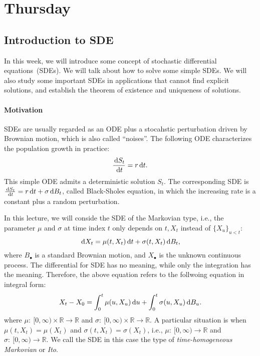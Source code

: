 


\section{Thursday}

\subsection{Introduction to SDE}
In this week, we will introduce some concept of stochastic differential equations~(SDEs).
We will talk about how to solve some simple SDEs.
We will also study some important SDEs in applications that cannot find explicit solutions, and establish the theorem of existence and uniqueness of solutions.

\paragraph{Motivation}
SDEs are usually regarded as an ODE plus a stocahstic perturbation driven by Brownian motion, which is also called ``noises''.
The following ODE characterizes the population growth in practice:
\[
\frac{\,\mathrm{d} S_t}{\,\mathrm{d} t}=r\,\mathrm{d} t.
\]
This simple ODE admits a deterministic solution $S_t$. 
The corresponding SDE is $\frac{\,\mathrm{d} S_t}{\,\mathrm{d} t} = r\,\mathrm{d} t + \sigma\,\mathrm{d} B_t$, called Black-Sholes equation, in which the increasing rate is a constant plus a random perturbation.

In this lecture, we will conside the SDE of the Markovian type, i.e., the parameter $\mu$ and $\sigma$ at time index $t$ only depends on $t,X_t$ instead of $\{X_u\}_{u<t}$:
\begin{equation}\label{Eq:13:1}
\diff X_t = \mu(t, X_t)\diff t + \sigma(t, X_t)\diff B_t, 
\end{equation}
where $B_{\bullet}$ is a standard Brownian motion, and $X_{\bullet}$ is the unknown continuous process. The differential for SDE has no meaning, while only the integration has the meaning. 
Therefore, the above equation refers to the follwoing equation in integral form:
\begin{equation}\label{Eq:13:2}
X_t-X_0 = \int_0^t\mu(u,X_u)\diff u + \int_0^t\sigma(u,X_u)\diff B_u.
\end{equation}
where $\mu:~[0,\infty)\times\mathbb{R}\to\mathbb{R}$ and $\sigma:~[0,\infty)\times\mathbb{R}\to\mathbb{R}$.
A particular situation is when $\mu(t,X_t)=\mu(X_t)$ and $\sigma(t,X_t)=\sigma(X_t)$, i.e., $\mu:~[0,\infty)\to\mathbb{R}$ and $\sigma:~[0,\infty)\to\mathbb{R}$.
We call the SDE in this case the type of \emph{time-homogeneous Markovian} or \emph{Ito}.

